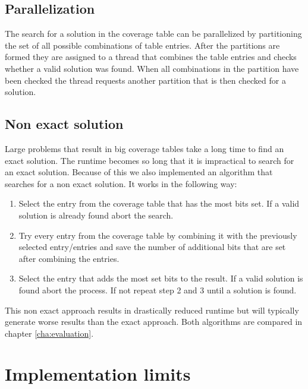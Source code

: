 \subsection{Parallelization}

The search for a solution in the coverage table can be parallelized by partitioning the set of all possible combinations of table entries. After the partitions are formed they are assigned to a thread that combines the table entries and checks whether a valid solution was found. When all combinations in the partition have been checked the thread requests another partition that is then checked for a solution.

\subsection{Non exact solution}

Large problems that result in big coverage tables take a long time to find an exact solution. The runtime becomes so long that it is impractical to search for an exact solution. Because of this we also implemented an algorithm that searches for a non exact solution. It works in the following way:
\begin{enumerate}
\item Select the entry from the coverage table that has the most bits set. If a valid solution is already found abort the search.
\item Try every entry from the coverage table by combining it with the previously selected entry/entries and save the number of additional bits that are set after combining the entries.
\item Select the entry that adds the most set bits to the result. If a valid solution is found abort the process. If not repeat step 2 and 3 until a solution is found.
\end{enumerate}

This non exact approach results in drastically reduced runtime but will typically generate worse results than the exact approach. Both algorithms are compared in chapter \ref{cha:evaluation}.

\section{Implementation limits}

